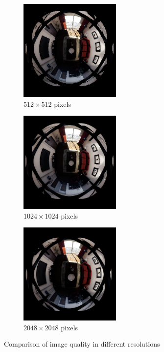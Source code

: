 \begin{figure}[!htb]
    \centering
    \begin{subfigure}{0.32\textwidth}
    \centering
        \includegraphics[height=5cm]{rapport/fig/Results/256to512.png}
        \caption{$512 \times 512$ pixels}
        \label{fig:res_comp_256_to_512}
    \end{subfigure}
    \begin{subfigure}{0.32\textwidth}
        \centering
        \includegraphics[height=5cm]{rapport/fig/Results/512to1024.jpeg}
        \caption{$1024 \times 1024$ pixels}
        \label{fig:res_comp_512_1024}
    \end{subfigure}    
    \begin{subfigure}{0.32\textwidth}
        \centering
        \includegraphics[height=5cm]{rapport/fig/Results/1024to2048.png}
        \caption{$2048 \times 2048$ pixels}
        \label{fig:res_comp_1024_2048}
    \end{subfigure}
    \centering
    \caption{Comparison of image quality in different resolutions}
    \label{fig_res_quality_comparison}
\end{figure}

